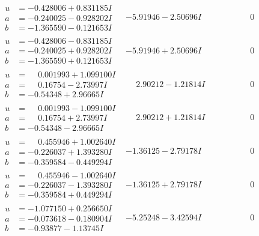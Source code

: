 \documentclass[1p]{elsarticle_modified}
\theoremstyle{definition}
\begin{document}
$$\begin{array}{c|c|c}
\begin{aligned}
u &= -0.428006 + 0.831185 I \\
a &= -0.240025 - 0.928202 I \\
b &= -1.365590 - 0.121653 I\end{aligned}
 & -5.91946 - 2.50696 I & \phantom{-0.000000 } 0 \\ \hline\begin{aligned}
u &= -0.428006 - 0.831185 I \\
a &= -0.240025 + 0.928202 I \\
b &= -1.365590 + 0.121653 I\end{aligned}
 & -5.91946 + 2.50696 I & \phantom{-0.000000 } 0 \\ \hline\begin{aligned}
u &= \phantom{-}0.001993 + 1.099100 I \\
a &= \phantom{-}0.16754 - 2.73997 I \\
b &= -0.54348 + 2.96665 I\end{aligned}
 & \phantom{-}2.90212 - 1.21814 I & \phantom{-0.000000 } 0 \\ \hline\begin{aligned}
u &= \phantom{-}0.001993 - 1.099100 I \\
a &= \phantom{-}0.16754 + 2.73997 I \\
b &= -0.54348 - 2.96665 I\end{aligned}
 & \phantom{-}2.90212 + 1.21814 I & \phantom{-0.000000 } 0 \\ \hline\begin{aligned}
u &= \phantom{-}0.455946 + 1.002640 I \\
a &= -0.226037 + 1.393280 I \\
b &= -0.359584 - 0.449294 I\end{aligned}
 & -1.36125 - 2.79178 I & \phantom{-0.000000 } 0 \\ \hline\begin{aligned}
u &= \phantom{-}0.455946 - 1.002640 I \\
a &= -0.226037 - 1.393280 I \\
b &= -0.359584 + 0.449294 I\end{aligned}
 & -1.36125 + 2.79178 I & \phantom{-0.000000 } 0 \\ \hline\begin{aligned}
u &= -1.077150 + 0.256650 I \\
a &= -0.073618 - 0.180904 I \\
b &= -0.93877 - 1.13745 I\end{aligned}
 & -5.25248 - 3.42594 I & \phantom{-0.000000 } 0 \\ \hline\begin{aligned}

\end{aligned}
\end{array}$$
\end{document}
